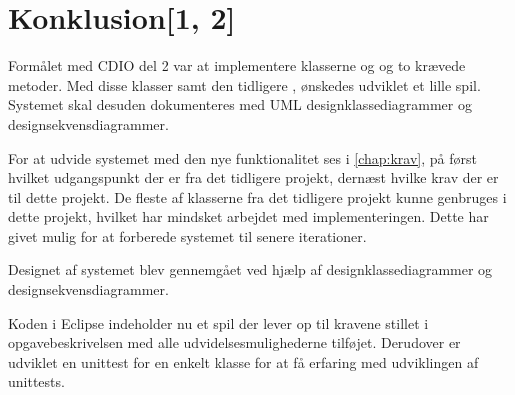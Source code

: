 \chapter{Konklusion[1, 2]}\label{chap:konklusion}
Formålet med CDIO del 2 var at implementere klasserne  og  og to krævede metoder. Med disse klasser samt den tidligere , ønskedes udviklet et lille spil. Systemet skal desuden dokumenteres med UML designklassediagrammer og designsekvensdiagrammer.

For at udvide systemet med den nye funktionalitet ses i \vref{chap:krav}, på først hvilket udgangspunkt der er fra det tidligere projekt, dernæst hvilke krav der er til dette projekt. De fleste af klasserne fra det tidligere projekt kunne genbruges i dette projekt, hvilket har mindsket arbejdet med implementeringen. Dette har givet mulig for at forberede systemet til senere iterationer.

Designet af systemet blev gennemgået ved hjælp af designklassediagrammer og designsekvensdiagrammer.

Koden i Eclipse indeholder nu et spil der lever op til kravene stillet i opgavebeskrivelsen \cite{CDIOdel2} med alle udvidelsesmulighederne tilføjet. Derudover er udviklet en unittest for en enkelt klasse for at få erfaring med udviklingen af unittests.